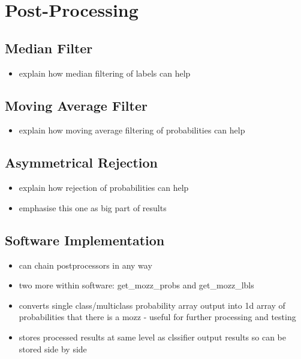 \section{Post-Processing}
\label{sec:pl-postproc}

    \subsection{Median Filter}
    \label{subsec:pl-postproc-med}
        \begin{itemize}
            \item{explain how median filtering of labels can help}
        \end{itemize}
        
    \subsection{Moving Average Filter}
    \label{subsec:pl-postproc-avg}
        \begin{itemize}
            \item{explain how moving average filtering of probabilities can help}
        \end{itemize}
        
    \subsection{Asymmetrical Rejection}
    \label{subsec:pl-postproc-rej}
        \begin{itemize}
            \item{explain how rejection of probabilities can help}
            \item{emphasise this one as big part of results}
        \end{itemize}
        
    \subsection{Software Implementation}
    \label{subsec:pl-postproc-software}
        \begin{itemize}
            \item{can chain postprocessors in any way}
            \item{two more within software: get\_mozz\_probs and get\_mozz\_lbls}
            \item{converts single class/multiclass probability array output into 1d array of probabilities that there is a mozz - useful for further processing and testing}
            \item{stores processed results at same level as clssifier output results so can be stored side by side}
        \end{itemize} 
